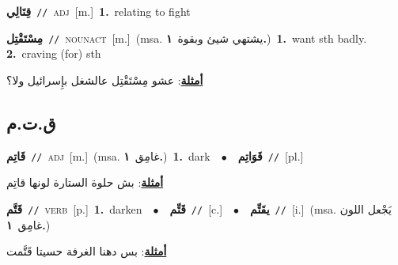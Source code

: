 \documentclass[10pt,a4paper,twoside]{article} %
\begin{document}
\begin{multicols}{2}
{\setlength\topsep{0pt}\textbf{\foreignlanguage{arabic}{قِتَالِي}}\ {\color{gray}\texttt{//}\color{black}}\ \textsc{adj}\ [m.]\ \textbf{1.}~relating to fight\ } \vspace{2mm}

{\setlength\topsep{0pt}\textbf{\foreignlanguage{arabic}{مِسْتَقْتِل}}\ {\color{gray}\texttt{//}\color{black}}\ \textsc{noun\textunderscore act}\ [m.]\ \color{gray}(msa. \foreignlanguage{arabic}{يشتهي شيئ وبقوة}~\foreignlanguage{arabic}{\textbf{١.}})\color{black}\ \textbf{1.}~want sth badly.  \textbf{2.}~craving (for) sth\  \begin{flushright}\color{gray}\foreignlanguage{arabic}{\textbf{\underline{\foreignlanguage{arabic}{أمثلة}}}: عشو مِسْتَقْتِل عالشغل بإِسرائيل ولا؟}\end{flushright}\color{black}} \vspace{2mm}

\vspace{-3mm}
\subsection*{\color{blue}\foreignlanguage{arabic}{ق.ت.م}\color{blue}{}} 

{\setlength\topsep{0pt}\textbf{\foreignlanguage{arabic}{قَاتِم}}\ {\color{gray}\texttt{//}\color{black}}\ \textsc{adj}\ [m.]\ \color{gray}(msa. \foreignlanguage{arabic}{غامِق}~\foreignlanguage{arabic}{\textbf{١.}})\color{black}\ \textbf{1.}~dark\ \ $\bullet$\ \ \setlength\topsep{0pt}\textbf{\foreignlanguage{arabic}{قَوَاتِم}}\ {\color{gray}\texttt{//}\color{black}}\ [pl.]\  \begin{flushright}\color{gray}\foreignlanguage{arabic}{\textbf{\underline{\foreignlanguage{arabic}{أمثلة}}}: بش حلوة الستارة لونها قاتِم}\end{flushright}\color{black}} \vspace{2mm}

{\setlength\topsep{0pt}\textbf{\foreignlanguage{arabic}{قَتَّم}}\ {\color{gray}\texttt{//}\color{black}}\ \textsc{verb}\ [p.]\ \textbf{1.}~darken\ \ $\bullet$\ \ \setlength\topsep{0pt}\textbf{\foreignlanguage{arabic}{قَتِّم}}\ {\color{gray}\texttt{//}\color{black}}\ [c.]\ \ $\bullet$\ \ \setlength\topsep{0pt}\textbf{\foreignlanguage{arabic}{يقَتِّم}}\ {\color{gray}\texttt{//}\color{black}}\ [i.]\ \color{gray}(msa. \foreignlanguage{arabic}{يَجْعل اللون غامِق}~\foreignlanguage{arabic}{\textbf{١.}})\color{black}\  \begin{flushright}\color{gray}\foreignlanguage{arabic}{\textbf{\underline{\foreignlanguage{arabic}{أمثلة}}}: بس دهنا الغرفة حسيتا قَتَّمت}\end{flushright}\color{black}} \vspace{2mm}


\end{multicols}
\end{document}
